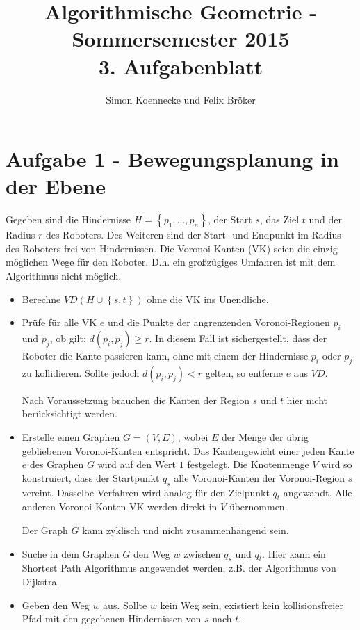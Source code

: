 \documentclass[a4paper]{article}
\begin{document}
\title{Algorithmische Geometrie - Sommersemester 2015\\
       3. Aufgabenblatt }
\author{Simon Koennecke und Felix Bröker}
\date{}
\maketitle

\section*{Aufgabe 1 - Bewegungsplanung in der Ebene}

Gegeben sind die Hindernisse $H = \left\{p_1, \dots, p_n\right\}$, der Start $s$, das Ziel $t$ und der Radius $r$ des Roboters. Des Weiteren sind der Start- und Endpunkt im Radius des Roboters frei von Hindernissen. Die Voronoi Kanten (VK) seien die einzig möglichen Wege für den Roboter. D.h. ein großzügiges Umfahren ist mit dem Algorithmus nicht möglich.

\begin{itemize}

\item Berechne $VD(H \cup \left\{s,t\right\})$ ohne die VK ins Unendliche.

\item Prüfe für alle VK $e$ und die Punkte der angrenzenden Voronoi-Regionen $p_i$ und $p_j$, ob gilt: $d(p_i, p_j) \geq r$. In diesem Fall ist sichergestellt, dass der Roboter die Kante passieren kann, ohne mit einem der Hindernisse $p_i$ oder $p_j$ zu kollidieren. Sollte jedoch $d(p_i, p_j) < r$ gelten, so entferne $e$ aus $VD$. 

Nach Voraussetzung brauchen
die Kanten der Region $s$ und $t$ hier nicht berücksichtigt werden. 

\item Erstelle einen Graphen $G = (V,E)$, wobei $E$
der Menge der übrig gebliebenen Voronoi-Kanten entspricht.
Das Kantengewicht einer jeden Kante $e$ des Graphen $G$
wird auf den Wert $1$ festgelegt. Die Knotenmenge $V$ wird so konstruiert, dass der Startpunkt $q_s$ alle Voronoi-Kanten der Voronoi-Region $s$ vereint. Dasselbe Verfahren wird analog für den Zielpunkt $q_t$ angewandt. Alle anderen Voronoi-Konten VK werden direkt in $V$ übernommen. 

Der Graph $G$ kann zyklisch und nicht zusammenhängend sein.

\item Suche in dem Graphen $G$ den Weg $w$ zwischen $q_s$ und $q_t$. Hier kann ein Shortest Path Algorithmus angewendet werden, z.B. der Algorithmus von Dijkstra.

\item Geben den Weg $w$ aus. Sollte $w$ kein Weg sein, existiert kein kollisionsfreier Pfad mit den gegebenen Hindernissen von $s$ nach $t$.

\end{itemize}  
\end{document}
